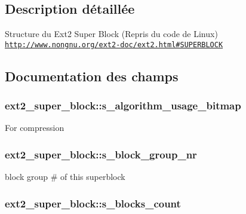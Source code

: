\subsection{\-Description détaillée}
\-Structure du \-Ext2 \-Super \-Block (\-Repris du code de \-Linux) \href{http://www.nongnu.org/ext2-doc/ext2.html#SUPERBLOCK}{\tt http\-://www.\-nongnu.\-org/ext2-\/doc/ext2.\-html\#\-S\-U\-P\-E\-R\-B\-L\-O\-C\-K} 

\subsection{\-Documentation des champs}
\hypertarget{structext2__super__block_ab3772dfdb48734922447cc462e5495ed}{
\subsubsection[{s\-\_\-algorithm\-\_\-usage\-\_\-bitmap}]{ {\bf ext2\-\_\-super\-\_\-block\-::s\-\_\-algorithm\-\_\-usage\-\_\-bitmap}}}\label{structext2__super__block_ab3772dfdb48734922447cc462e5495ed}
\-For compression \hypertarget{structext2__super__block_aa69ff4c80207a79de2464e3065df607c}{
\subsubsection[{s\-\_\-block\-\_\-group\-\_\-nr}]{ {\bf ext2\-\_\-super\-\_\-block\-::s\-\_\-block\-\_\-group\-\_\-nr}}}\label{structext2__super__block_aa69ff4c80207a79de2464e3065df607c}
block group \# of this superblock \hypertarget{structext2__super__block_a3878ffaff13c625cce6b825ecb797547}{
\subsubsection[{s\-\_\-blocks\-\_\-count}]{ {\bf ext2\-\_\-super\-\_\-block\-::s\-\_\-blocks\-\_\-count}}}\label{structext2__super__block_a3878ffaff13c625cce6b825ecb797547}
